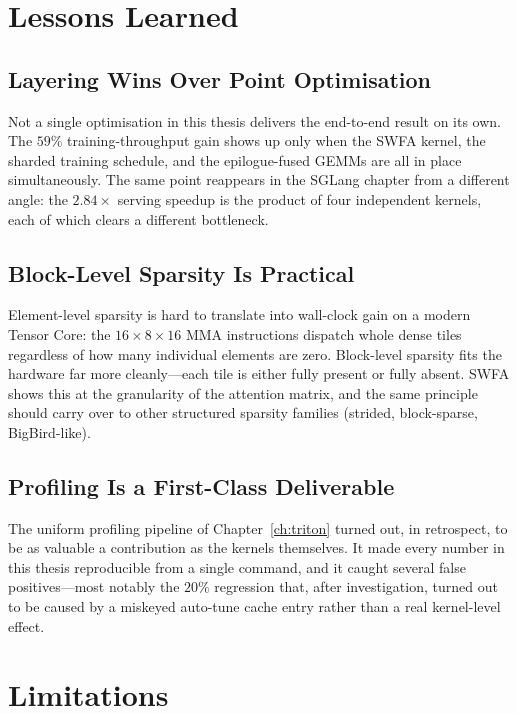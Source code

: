 \section{Lessons Learned}\label{sec:concl_lessons}

\subsection{Layering Wins Over Point Optimisation}\label{sec:concl_layering}
Not a single optimisation in this thesis delivers the
end-to-end result on its own. The $59\%$ training-throughput
gain shows up only when the SWFA kernel, the sharded training
schedule, and the epilogue-fused GEMMs are all in place
simultaneously. The same point reappears in the SGLang chapter
from a different angle: the $2.84\times$ serving speedup is the
product of four independent kernels, each of which clears a
different bottleneck.

\subsection{Block-Level Sparsity Is Practical}\label{sec:concl_sparsity}
Element-level sparsity is hard to translate into wall-clock gain
on a modern Tensor Core: the $16 \times 8 \times 16$ MMA
instructions dispatch whole dense tiles regardless of how many
individual elements are zero. Block-level sparsity fits the
hardware far more cleanly---each tile is either fully present or
fully absent. SWFA shows this at the granularity of the attention
matrix, and the same principle should carry over to other
structured sparsity families (strided, block-sparse,
BigBird-like).

\subsection{Profiling Is a First-Class
Deliverable}\label{sec:concl_profiling}
The uniform profiling pipeline of Chapter~\ref{ch:triton} turned
out, in retrospect, to be as valuable a contribution as the
kernels themselves. It made every number in this thesis
reproducible from a single command, and it caught several false
positives---most notably the $20\%$ regression that, after
investigation, turned out to be caused by a miskeyed auto-tune
cache entry rather than a real kernel-level effect.

\section{Limitations}\label{sec:concl_limitations}

